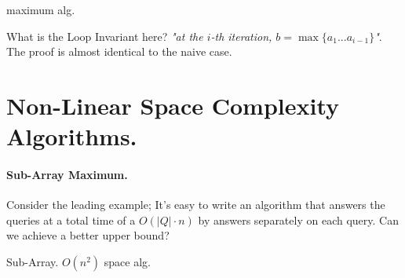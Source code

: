 \begin{example}
\begin{algorithm}[H]
{}
 \caption{maximum alg.}
\end{algorithm}

What is the Loop Invariant here? \textit{"at the \(i\)-th iteration, \(b = \max{ \{ a_1 ... a_{i-1} \} } \)"}. The proof is almost identical to the naive case.   
\end{example}
\section{Non-Linear Space Complexity Algorithms. }
\paragraph{Sub-Array Maximum.} Consider the leading example; It's easy to write an algorithm that answers the queries at a total time of a \( O\left( |Q| \cdot n \right) \) by answers separately on each query. Can we achieve a better upper bound?



%
%
\begin{algorithm}
  \caption{Sub-Array. \(O(n^2)\) space alg.}
{}
\end{algorithm}
%

